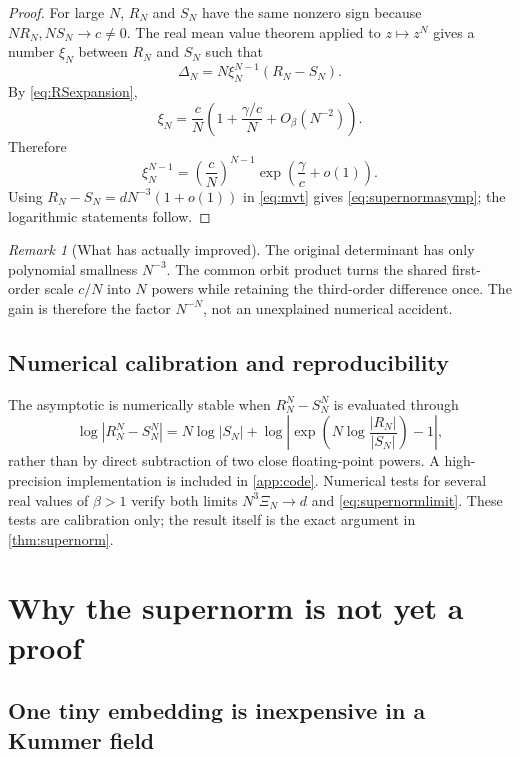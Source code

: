 \documentclass[11pt]{article}
\theoremstyle{definition}
\theoremstyle{remark}
\newtheorem{remark}[theorem]{Remark}
\begin{document}
\begin{proof}
For large $N$, $R_N$ and $S_N$ have the same nonzero sign because
$N R_N,N S_N\to c\ne0$.  The real mean value theorem applied to $z\mapsto z^N$
gives a number $\xi_N$ between $R_N$ and $S_N$ such that
\begin{equation}\label{eq:mvt}
 \Delta_N=N\xi_N^{N-1}(R_N-S_N).
\end{equation}
By \eqref{eq:RSexpansion},
\[
 \xi_N=\frac cN\left(1+\frac{\gamma/c}{N}+O_\beta(N^{-2})\right).
\]
Therefore
\[
 \xi_N^{N-1}
 =\left(\frac cN\right)^{N-1}
 \exp\!\left(\frac\gamma c+o(1)\right).
\]
Using $R_N-S_N=dN^{-3}(1+o(1))$ in \eqref{eq:mvt} gives
\eqref{eq:supernormasymp}; the logarithmic statements follow.
\end{proof}

\begin{remark}[What has actually improved]
The original determinant has only polynomial smallness $N^{-3}$.  The common
orbit product turns the shared first-order scale $c/N$ into $N$ powers while
retaining the third-order difference once.  The gain is therefore the factor
$N^{-N}$, not an unexplained numerical accident.
\end{remark}

\subsection{Numerical calibration and reproducibility}

The asymptotic is numerically stable when $R_N^N-S_N^N$ is evaluated through
\[
 \log|R_N^N-S_N^N|
 =N\log|S_N|+\log\left|\exp\!\left(N\log\frac{|R_N|}{|S_N|}\right)-1\right|,
\]
rather than by direct subtraction of two close floating-point powers.  A
high-precision implementation is included in \cref{app:code}.  Numerical tests
for several real values of $\beta>1$ verify both limits
$N^3\Xi_N\to d$ and \eqref{eq:supernormlimit}.  These tests are calibration only;
the result itself is the exact argument in \cref{thm:supernorm}.

\section{Why the supernorm is not yet a proof}

\subsection{One tiny embedding is inexpensive in a Kummer field}
\end{document}
